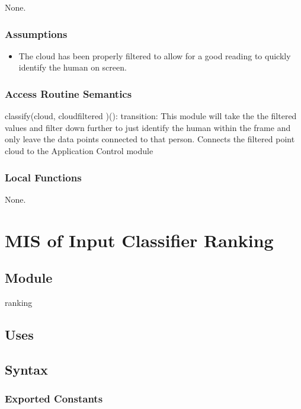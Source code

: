 \documentclass[12pt, titlepage]{article}
\begin{document}
None.

\subsubsection{Assumptions}

\begin{itemize}
  \item The cloud has been properly filtered to allow for a good reading to quickly identify the human on screen.
\end{itemize}

\subsubsection{Access Routine Semantics}

\noindent classify(cloud, cloudfiltered )():
transition: This module will take the the filtered values and filter down further to just identify the human within the frame and only leave the data points connected to that person.
Connects the filtered point cloud to the Application Control module
\subsubsection{Local Functions}

None.
\newpage

\section{MIS of Input Classifier Ranking} \label{ModuleICR} 

\subsection{Module}

ranking

\subsection{Uses}

\subsection{Syntax}

\subsubsection{Exported Constants}
\end{document}
